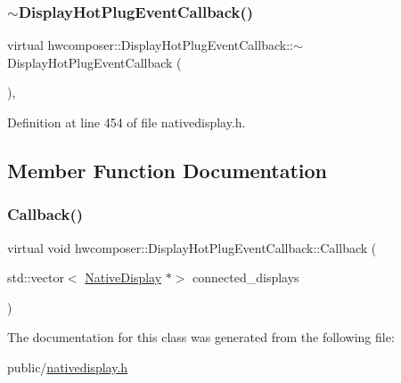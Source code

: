 \subsubsection{\texorpdfstring{$\sim$\+Display\+Hot\+Plug\+Event\+Callback()}{~DisplayHotPlugEventCallback()}}
{\footnotesize\ttfamily virtual hwcomposer\+::\+Display\+Hot\+Plug\+Event\+Callback\+::$\sim$\+Display\+Hot\+Plug\+Event\+Callback (\begin{DoxyParamCaption}{ }\end{DoxyParamCaption})\hspace{0.3cm}{\ttfamily [inline]}, {\ttfamily [virtual]}}



Definition at line 454 of file nativedisplay.\+h.


\begin{DoxyCode}{0}
\end{DoxyCode}


\subsection{Member Function Documentation}
\mbox{\label{classhwcomposer_1_1DisplayHotPlugEventCallback_aa0185bcd7a64dda124cd63ef8d0e46ec}} 
\subsubsection{\texorpdfstring{Callback()}{Callback()}}
{\footnotesize\ttfamily virtual void hwcomposer\+::\+Display\+Hot\+Plug\+Event\+Callback\+::\+Callback (\begin{DoxyParamCaption}\item[{std\+::vector$<$ \mbox{\hyperlink{classhwcomposer_1_1NativeDisplay}{Native\+Display}} $\ast$$>$}]{connected\+\_\+displays }\end{DoxyParamCaption})\hspace{0.3cm}{\ttfamily [pure virtual]}}



The documentation for this class was generated from the following file\+:\begin{DoxyCompactItemize}
\item 
public/\mbox{\hyperlink{nativedisplay_8h}{nativedisplay.\+h}}\end{DoxyCompactItemize}
